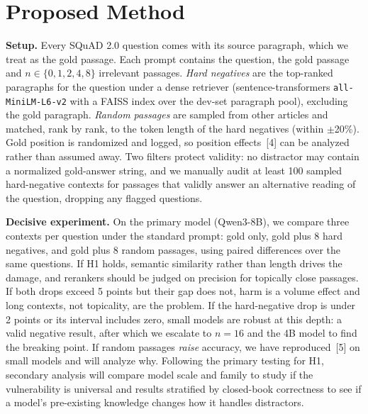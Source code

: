 \documentclass[11pt]{article}
\begin{document}
\section{Proposed Method}
\textbf{Setup.} Every SQuAD 2.0 question comes with its source paragraph, which we treat as the gold passage. Each prompt contains the question, the gold passage and $n\in\{0,1,2,4,8\}$ irrelevant passages. \emph{Hard negatives} are the top-ranked paragraphs for the question under a dense retriever (sentence-transformers \texttt{all-MiniLM-L6-v2} with a FAISS index over the dev-set paragraph pool), excluding the gold paragraph. \emph{Random passages} are sampled from other articles and matched, rank by rank, to the token length of the hard negatives (within $\pm$20\%). Gold position is randomized and logged, so position effects~[4] can be analyzed rather than assumed away. Two filters protect validity: no distractor may contain a normalized gold-answer string, and we manually audit at least 100 sampled hard-negative contexts for passages that validly answer an alternative reading of the question, dropping any flagged questions.

\textbf{Decisive experiment.} On the primary model (Qwen3-8B), we compare three contexts per question under the standard prompt: gold only, gold plus 8 hard negatives, and gold plus 8 random passages, using paired differences over the same questions. If H1 holds, semantic similarity rather than length drives the damage, and rerankers should be judged on precision for topically close passages. If both drops exceed 5 points but their gap does not, harm is a volume effect and long contexts, not topicality, are the problem. If the hard-negative drop is under 2 points or its interval includes zero, small models are robust at this depth: a valid negative result, after which we escalate to $n=16$ and the 4B model to find the breaking point. If random passages \emph{raise} accuracy, we have reproduced~[5] on small models and will analyze why. Following the primary testing for H1, secondary analysis will compare model scale and family to study if the vulnerability is universal and results stratified by closed-book correctness to see if a model's pre-existing knowledge changes how it handles distractors.
\end{document}
